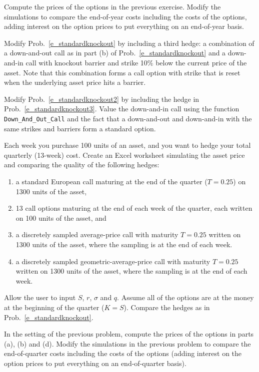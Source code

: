 \begin{prob}
Compute the prices of the options in the previous exercise.  Modify the simulations to compare the end-of-year costs including the costs of the options, adding interest on the option prices to put everything on an end-of-year basis.
\end{prob}\begin{prob} 
Modify Prob.~\ref{e_standardknockout} by including a third hedge: a combination of a down-and-out call as in part (b) of Prob.~\ref{e_standardknockout} and a down-and-in call with knockout barrier and strike 10\% below the current price of the asset.  Note that this combination forms a call option with strike that is reset when the underlying asset price hits a barrier.\label{e_standardknockout3}
\end{prob}\begin{prob}
Modify Prob.~\ref{e_standardknockout2} by including the hedge in Prob.~\ref{e_standardknockout3}.  Value the down-and-in call using the function \verb!Down_And_Out_Call! and the fact that a down-and-out and down-and-in with the same strikes and barriers form a standard option. \label{e_standardknockout4}
\end{prob}\begin{prob} \label{e_averagehedge} Each week you purchase 100 units of an asset, and you want to hedge your total quarterly (13-week) cost.  Create an Excel worksheet simulating the asset price and comparing the quality of the following hedges: 
\begin{enumerate}
\renewcommand{\labelenumi}{(\alph{enumi})}
\item a standard European call maturing at the end of the quarter ($T=0.25$) on 1300 units of the asset, 
\item 13 call options maturing at the end of each week of the quarter, each written on 100 units of the asset, and 
\item a discretely sampled average-price call with maturity $T=0.25$ written on 1300 units of the asset, where the sampling is at the end of each week.  
\item a discretely sampled geometric-average-price call with maturity $T=0.25$ written on 1300 units of the asset, where the sampling is at the end of each week.
\end{enumerate}
Allow the user to input $S$, $r$, $\sigma$ and $q$.  Assume all of the options are at the money at the beginning of the quarter ($K=S$).  Compare the hedges as in Prob.~\ref{e_standardknockout}.
\end{prob}\begin{prob} In the setting of the previous problem, compute the prices of the options in parts (a), (b) and (d).  Modify the simulations in the previous problem to compare the end-of-quarter costs including the costs of the options (adding interest on the option prices to put everything on an end-of-quarter basis).\label{e_averagehedge2}

\end{prob}
